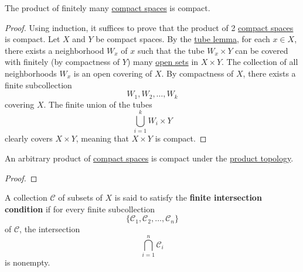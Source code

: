   \begin{theorem}
    \label{thm:finite-products}
    The product of finitely many \hyperref[def:compact-space]{compact spaces} is compact. 
  \end{theorem}
  \begin{proof}
    Using induction, it suffices to prove that the product of 2 \hyperref[def:compact-space]{compact spaces} is compact. Let $X$ and $Y$ be compact spaces. By the \hyperref[thm:tube-lemma]{tube lemma}, for each $x \in X$, there exists a neighborhood $W_x$ of $x$ such that the tube $W_x \times Y$ can be covered with finitely (by compactness of $Y$) many \hyperref[def:open-set]{open sets} in $X \times Y$. The collection of all neighborhoods $W_x$ is an open covering of $X$. By compactness of $X$, there exists a finite subcollection
    \begin{equation}
      W_1, W_2, \ldots , W_k
    \end{equation}
    covering $X$. The finite union of the tubes 
    \begin{equation}
      \bigcup_{i=1}^k W_i \times Y
    \end{equation}
    clearly covers $X \times Y$, meaning that $X \times Y$ is compact. 
  \end{proof}

  \begin{theorem}
    \label{thm:tychonoff-theorem}
    An arbitrary product of \hyperref[def:compact-space]{compact spaces} is compact under the \hyperref[def:product-topology]{product topology}. 
  \end{theorem}
  \begin{proof}
    
  \end{proof}

  \begin{definition}
    \label{def:finite-intersection-condition}
    A collection $\mathcal{C}$ of subsets of $X$ is said to satisfy the \textbf{finite intersection condition} if for every finite subcollection 
    \begin{equation}
      \{\mathcal{C}_1, \mathcal{C}_2, \ldots , \mathcal{C}_n\}
    \end{equation}
    of $\mathcal{C}$, the intersection
    \begin{equation}
      \bigcap_{i=1}^n \mathcal{C}_i
    \end{equation}
    is nonempty. 
  \end{definition}

